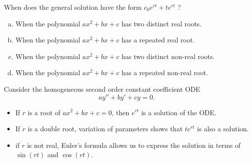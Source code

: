 \begin{applicationActivities}
\begin{activity}{5}
When does the general solution have the form \(c_0 e^{rt}+te^{rt}\) ?
\begin{enumerate}[(a)]
\item When the polynomial \(ax^2+bx+c\) has two distinct real roots.
\item When the polynomial \(ax^2+bx+c\) has a repeated real root.
\item When the polynomial \(ax^2+bx+c\) has two distinct non-real roots.
\item When the polynomial \(ax^2+bx+c\) has a repeated non-real root.
\end{enumerate}
\end{activity}


\begin{observation}
Consider the homogeneous second order constant coefficient ODE \[ay''+by'+cy=0.\]
\vfill
\begin{itemize}
\item If \(r\) is a root of \(ax^2+bx+c=0\), then \(e^{rt}\) is a solution of the ODE.
\item If \(r\) is a double root, variation of parameters shows that \(te^{rt}\) is also a solution.
\item if \(r\) is not real, Euler's formula allows us to express the solution in terms of \(\sin(rt)\) and \(\cos(rt)\).
\end{itemize}
\end{observation}



\end{applicationActivities}
